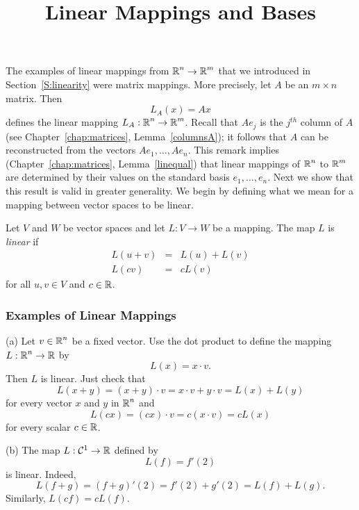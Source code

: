\documentclass{ximera}
\title{Linear Mappings and Bases}
\begin{document}
\begin{abstract}
\end{abstract}
\maketitle

  \label{Sect:linmap}

The examples of linear mappings
 from $\mbox{$\Bbb{R}$}^n\to\mbox{$\Bbb{R}$}^m$ that we introduced in
Section~\ref{S:linearity} were matrix mappings.  More precisely,
let $A$ be an $m\times n$ matrix.  Then
\[
L_A(x)=Ax
\]
defines the linear mapping $L_A:\mbox{$\Bbb{R}$}^n\to\mbox{$\Bbb{R}$}^m$.  Recall that $Ae_j$
is the $j^{th}$ column of $A$ (see Chapter~\ref{chap:matrices},
Lemma~\ref{columnsA}); it follows that $A$ can be
reconstructed from the vectors $Ae_1,\ldots,Ae_n$.  This remark
implies (Chapter~\ref{chap:matrices}, Lemma~\ref{linequal}) that
linear mappings of $\mbox{$\Bbb{R}$}^n$ to $\mbox{$\Bbb{R}$}^m$ are determined by their
values on the standard basis $e_1, \ldots, e_n$.  Next we show
that this result is valid in greater generality.  We begin by
defining what we mean for a mapping between vector spaces to be
linear.

\begin{Def}  \label{D:linearV}
Let $V$ and $W$ be vector spaces and let $L:V\to W$ be a mapping.  The map
$L$ is {\em linear\/} if
\begin{eqnarray*}
L(u+v) & = & L(u) + L(v) \\
L(cv) & = & cL(v)
\end{eqnarray*}
for all $u,v\in V$ and $c\in\mbox{$\Bbb{R}$}$.
\end{Def} 

\subsubsection*{Examples of Linear Mappings}

\noindent (a) Let $v\in\mbox{$\Bbb{R}$}^n$ be a fixed vector.  Use the
dot product to define the mapping
$L:\mbox{$\Bbb{R}$}^n\to\mbox{$\Bbb{R}$}$ by
\[
L(x)= x\cdot v.
\]
Then $L$ is linear.  Just check that
\[
L(x+y) = (x+y)\cdot v = x\cdot v + y\cdot v = L(x) + L(y)
\]
for every vector $x$ and $y$ in $\mbox{$\Bbb{R}$}^n$ and
\[
L(cx) = (cx)\cdot v = c(x\cdot v) = cL(x)
\]
for every scalar $c\in\mbox{$\Bbb{R}$}$.

\noindent (b) The map $L:{\cal C}^1\to\mbox{$\Bbb{R}$}$ defined by
\[
L(f) = f'(2)
\]
is linear.  Indeed,
\[
L(f+g) = (f+g)'(2) = f'(2) + g'(2) = L(f) + L(g).
\]
Similarly, $L(cf)=cL(f)$.
\end{document}
